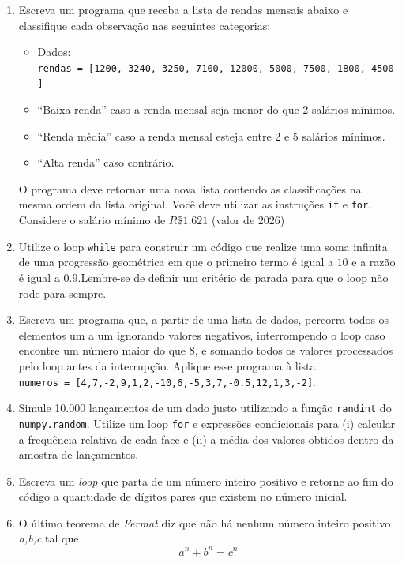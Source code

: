 \documentclass[
  brazilian,
  letterpaper,
  DIV=11,
  numbers=noendperiod]{scrreprt}
\providecommand{\tightlist}{%
  \setlength{\itemsep}{0pt}\setlength{\parskip}{0pt}}
\begin{document}
\begin{enumerate}
\def\labelenumi{\arabic{enumi}.}
\item
  Escreva um programa que receba a lista de rendas mensais abaixo e
  classifique cada observação nas seguintes categorias:

  \begin{itemize}
  \tightlist
  \item
    Dados:
    \texttt{rendas\ =\ {[}1200,\ 3240,\ 3250,\ 7100,\ 12000,\ 5000,\ 7500,\ 1800,\ 4500{]}}
  \item
    ``Baixa renda'' caso a renda mensal seja menor do que 2 salários
    mínimos.
  \item
    ``Renda média'' caso a renda mensal esteja entre 2 e 5 salários
    mínimos.
  \item
    ``Alta renda'' caso contrário.
  \end{itemize}

  O programa deve retornar uma nova lista contendo as classificações na
  mesma ordem da lista original. Você deve utilizar as instruções
  \texttt{if} e \texttt{for}. Considere o salário mínimo de
  \(R\$ 1.621\) (valor de 2026)
\item
  Utilize o loop \texttt{while} para construir um código que realize uma
  soma infinita de uma progressão geométrica em que o primeiro termo é
  igual a \(10\) e a razão é igual a \(0.9\).Lembre-se de definir um
  critério de parada para que o loop não rode para sempre.
\item
  Escreva um programa que, a partir de uma lista de dados, percorra
  todos os elementos um a um ignorando valores negativos, interrompendo
  o loop caso encontre um número maior do que \(8\), e somando todos os
  valores processados pelo loop antes da interrupção. Aplique esse
  programa à lista
  \texttt{numeros\ =\ {[}4,7,-2,9,1,2,-10,6,-5,3,7,-0.5,12,1,3,-2{]}}.
\item
  Simule 10.000 lançamentos de um dado justo utilizando a função
  \texttt{randint} do \texttt{numpy.random}. Utilize um loop
  \texttt{for} e expressões condicionais para (i) calcular a frequência
  relativa de cada face e (ii) a média dos valores obtidos dentro da
  amostra de lançamentos.
\item
  Escreva um \emph{loop} que parta de um número inteiro positivo e
  retorne ao fim do código a quantidade de dígitos pares que existem no
  número inicial.
\item
  O último teorema de \emph{Fermat} diz que não há nenhum número inteiro
  positivo \emph{a,b,c} tal que \[ a^n + b^n = c^n \]


\end{enumerate}
\end{document}
